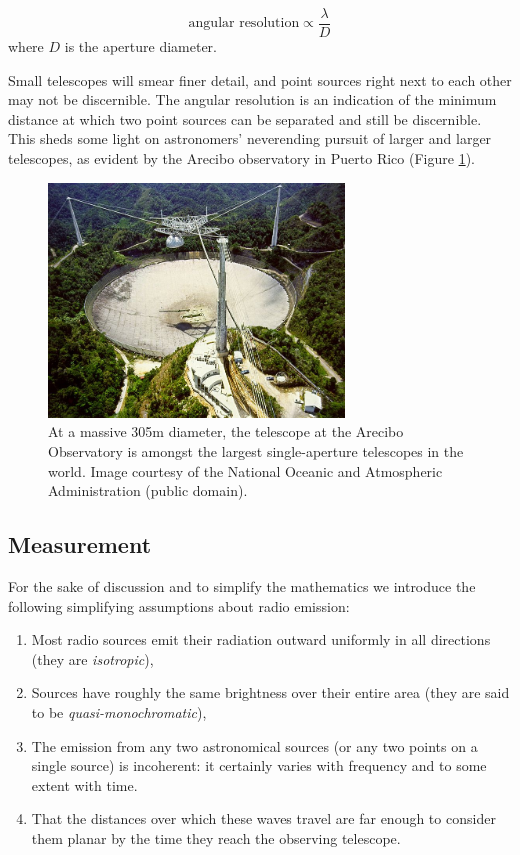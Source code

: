 \begin{equation*}
 \text{angular resolution} \propto \frac{\lambda}{D}
\end{equation*}
where $D$ is the aperture diameter.

Small telescopes will smear finer detail, and point sources right next to each other may not be discernible. The angular resolution is
an indication of the minimum distance at which two point sources can be separated and still be discernible. This sheds some light on astronomers'
neverending pursuit of larger and larger telescopes, as evident by the Arecibo observatory in Puerto Rico (Figure \ref{fig_arecibo}).

\begin{figure}[ht]
 \begin{mdframed}
 \centering
 \includegraphics[width=0.7\textwidth]{images/arecibo.jpg}
 \caption[Arecibo Observatory]{At a massive 305m diameter, the telescope at the Arecibo Observatory is amongst the largest single-aperture telescopes in the world. 
 Image courtesy of the National Oceanic and Atmospheric Administration (public domain).}
  \label{fig_arecibo}
 \end{mdframed}
\end{figure}

\subsection{Measurement}
For the sake of discussion and to simplify the mathematics we introduce the following simplifying assumptions about radio emission:
\begin{enumerate}
 \item Most radio sources emit their radiation outward uniformly in all directions (they are \textit{isotropic}),
 \item Sources have roughly the same brightness over their entire area (they are said to be \textit{quasi-monochromatic}), 
 \item The emission from any two astronomical sources (or any two points on a single source) is incoherent: it certainly
 varies with frequency and to some extent with time.
 \item That the distances over which these waves travel are far enough to consider them planar by the time they reach the 
 observing telescope.
\end{enumerate}

